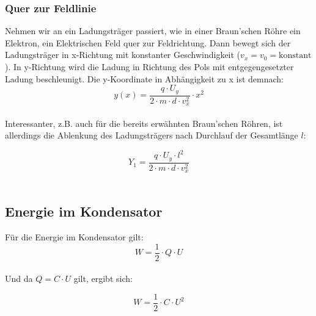 \documentclass[a4paper]{article}
\begin{document}
\subsubsection{Quer zur Feldlinie}

Nehmen wir an ein Ladungsträger passiert, wie in einer Braun'schen Röhre ein Elektron, ein Elektrischen Feld
quer zur Feldrichtung. Dann bewegt sich der Ladungsträger in x-Richtung mit konstanter Geschwindigkeit
($v_x = v_0 = \text{konstant}$). In y-Richtung wird die Ladung in Richtung des Pols mit entgegengesetzter Ladung
beschleunigt. Die y-Koordinate in Abhängigkeit zu x ist demnach:\\ $$y(x) = \dfrac{q \cdot U_y}{2 \cdot m \cdot d \cdot v_x ^2} \cdot x^2$$\\

Interessanter, z.B. auch für die bereits erwähnten Braun'schen Röhren, ist allerdings die Ablenkung des Ladungsträgers
nach Durchlauf der Gesamtlänge $l$:

\Large$$Y_1 = \dfrac{q \cdot U_y \cdot l^2}{2 \cdot m \cdot d \cdot v_x ^2}$$\\ \normalsize



\subsection{Energie im Kondensator}

Für die Energie im Kondensator gilt:\\

$$W = \frac{1}{2} \cdot Q \cdot U$$\\

Und da $Q = C \cdot U$ gilt, ergibt sich:

\Large$$W = \frac{1}{2} \cdot C \cdot U^2$$\\ \normalsize
\end{document}
